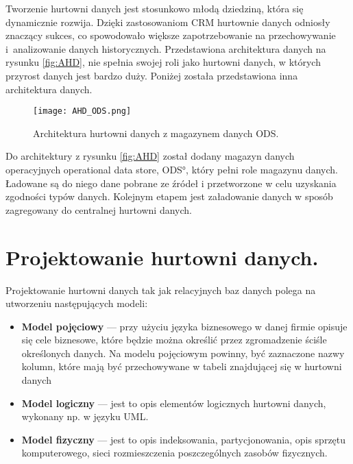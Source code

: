  
Tworzenie hurtowni danych jest stosunkowo młodą dziedziną, która się dynamicznie rozwija.
Dzięki zastosowaniom CRM hurtownie danych odniosły znaczący sukces, co spowodowało większe zapotrzebowanie na przechowywanie i~analizowanie danych historycznych. 
Przedstawiona architektura danych na rysunku \ref{fig:AHD}, nie spełnia swojej roli jako hurtowni danych, w których przyrost danych jest bardzo duży.
Poniżej została przedstawiona inna architektura danych.
\begin{center}
\begin{figure}[H]
  \begin{center}
    \texttt{[image: AHD\_ODS.png]}
  \end{center}
  \caption{Architektura hurtowni danych z magazynem danych ODS. }
    \label{fig:ODS}
\end{figure}
\end{center}

Do architektury z rysunku \ref{fig:AHD} został dodany magazyn danych operacyjnych \ang{operational data store, ODS}, który
pełni role magazynu danych. Ładowane są do niego dane pobrane ze źródeł i przetworzone w celu uzyskania zgodności typów danych.
Kolejnym etapem jest załadowanie danych w sposób zagregowany do centralnej hurtowni danych.


\section{Projektowanie hurtowni danych.}
Projektowanie hurtowni danych tak jak relacyjnych baz danych polega na utworzeniu następujących modeli\cite{TodMan}:

\begin{itemize}
 \item \textbf{Model pojęciowy} --- 
    przy użyciu języka biznesowego w danej firmie opisuje się cele biznesowe, 
    które będzie można określić przez zgromadzenie ściśle określonych danych.
   Na modelu pojęciowym powinny, być zaznaczone nazwy kolumn, które mają być przechowywane 
    w tabeli znajdującej się w hurtowni danych
 \item \textbf{Model logiczny} --- 
    jest to opis elementów  logicznych hurtowni danych, wykonany np. w języku UML.
 \item \textbf{Model fizyczny} --- 
    jest to opis indeksowania, partycjonowania, opis sprzętu komputerowego, sieci
     rozmieszczenia poszczególnych zasobów fizycznych.
\end{itemize}

